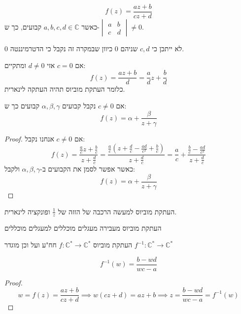 \documentclass{tstextbook}
\begin{document}
\begin{definition}
$$f(z)=\frac{az+b}{cz+d}$$
כאשר \(a,b,c,d\in \mathbb{C}\) קבועים, כך ש-\(\begin{vmatrix}a&b\\ c&d\end{vmatrix}\neq 0\).

\end{definition}
\begin{remark}
לא ייתכן כי \(c,d\) שניהם 0 כיוון שבמקרה זה נקבל כי הדטרמיננטה 0.

\end{remark}
\begin{proposition}
אם \(c=0\) אזי \(d\neq 0\) ומתקיים:
$$f(z)=\frac{az+b}{d}=\frac{a}{d}z+\frac{b}{d}$$
כלומר העתקת מוביוס תהיה העתקה לינארית.

\end{proposition}
\begin{proposition}
אם \(c\neq 0\) נקבל קבועים \(\alpha,\beta,\gamma\) קבועים כך ש:
$$f(z)=\alpha+\frac{\beta}{z+\gamma}$$

\end{proposition}
\begin{proof}
אם \(c\neq 0\) אנחנו נקבל:
$$f(z)= \frac{\frac{a}{c}z+\frac{b}{c}}{z+\frac{d}{c}}= \frac{\frac{a}{c}\left( z+\frac{d}{c}-\frac{ad}{c^2}+\frac{b}{c} \right)}{z+\frac{d}{c}}=\frac{a}{c}+\frac{\frac{b}{c}-\frac{ad}{c^2}}{z+\frac{d}{c}}$$
כאשר אפשר לסמן את הקבועים ב-\(\alpha,\beta,\gamma\) ולקבל:
$$f(z)=\alpha+\frac{\beta}{z+\gamma}$$

\end{proof}
\begin{corollary}
העתקת מוביוס למעשה הרכבה של הזזה של \(\frac{1}{z}\) ופונקציה לינארית.

\end{corollary}
\begin{corollary}
העתקת מוביוס מעבירה מעגלים מוכללים למעגלים מוכללים

\end{corollary}
\begin{proposition}
העתקת מוביוס \(f:\mathbb{C}^*\to \mathbb{C}^*\) חח"ע ועל וכן מוגדר \(f^{-1}: \mathbb{C}^*\to \mathbb{C}^*\)

\end{proposition}
\begin{proposition}
$$f^{-1}(w)= \frac{b-wd}{wc-a}$$

\end{proposition}
\begin{proof}
$$w=f(z)=\frac{az+b}{cz+d}\implies w(cz+d)=az+b \implies z = \frac{b-wd}{wc-a}=f^{-1}(w)$$

\end{proof}
\end{document}
